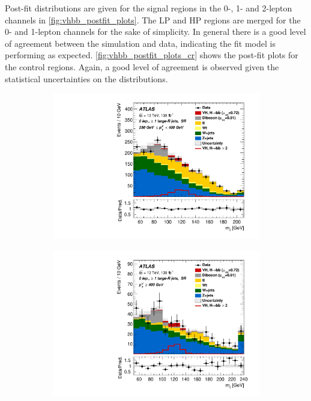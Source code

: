 Post-fit \mJ distributions are given for the signal regions in the 0-, 1- and 2-lepton channels in \cref{fig:vhbb_postfit_plots}.
The LP and HP regions are merged for the 0- and 1-lepton channels for the sake of simplicity.
In general there is a good level of agreement between the simulation and data, indicating the fit model is performing as expected.
\cref{fig:vhbb_postfit_plots_cr} shows the post-fit plots for the \ttbar control regions.
Again, a good level of agreement is observed given the statistical uncertainties on the distributions.

\begin{figure}[!htbp]
  \centering
  \begin{subfigure}{.4\textwidth}
    \includegraphics[width=\textwidth]{chapters/6.vhbb_boosted/figs/Region_BMin250_BMax400_incFat1_Fat1_Y6051_DSRnoaddbjetsr_T2_L0_distmBB_GlobalFit_unconditionnal_mu1.pdf}
  \end{subfigure}%
  \begin{subfigure}{.4\textwidth}
    \includegraphics[width=\textwidth]{chapters/6.vhbb_boosted/figs/Region_BMin400_incFat1_Fat1_Y6051_DSRnoaddbjetsr_T2_L0_distmBB_GlobalFit_unconditionnal_mu1.pdf}

\end{subfigure}
\end{figure}
